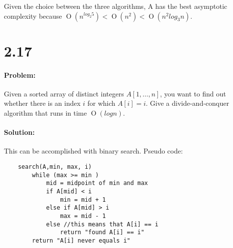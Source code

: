 \documentclass[12pt]{article}
\newcommand{\BigO}[1]{\ensuremath{\operatorname{O}\left(#1\right)}}
\begin{document}
Given the choice between the three algorithms, A has the best asymptotic
complexity because $\BigO{n^{log_2 5}} < \BigO{n^{2}} < \BigO{n^{2}log_3 n}$.

\section*{2.17}
\paragraph{Problem:}

Given a sorted array of distinct integers $A[1, \dots , n]$, you want to
find out whether there is an index $i$ for which $A[i] = i$. Give a
divide-and-conquer algorithm that runs in time $\BigO{log n}$.

\paragraph{Solution:}
This can be accomplished with binary search. Pseudo code:
\begin{verbatim}
    search(A,min, max, i)
        while (max >= min )
            mid = midpoint of min and max
            if A[mid] < i
                min = mid + 1
            else if A[mid] > i
                max = mid - 1
            else //this means that A[i] == i
                return "found A[i] == i"
        return "A[i] never equals i"
\end{verbatim}
\end{document}

